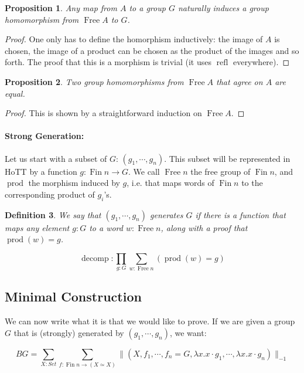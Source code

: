 \documentclass{article}
\DeclareMathOperator{\product}{prod}
\DeclareMathOperator{\decomp}{decomp}
\DeclareMathOperator{\fin}{Fin}
\DeclareMathOperator{\free}{Free}
\DeclareMathOperator{\refl}{refl}
\newtheorem{definition}{Definition}[section]
\newtheorem{proposition}[definition]{Proposition}
\begin{document}
\begin{proposition}
  Any map from $A$ to a group $G$ naturally induces a group homomorphism from $\free A$ to $G$.
\end{proposition}

\begin{proof}
  One only has to define the homorphism inductively: the image of $A$ is chosen, the image of a product can be chosen as the product of the images and so forth. The proof that this is a morphism is trivial (it uses $\refl$ everywhere).
\end{proof}

\begin{proposition} \label{uniq}
  Two group homomorphisms from $\free A$ that agree on $A$ are equal.
\end{proposition}

\begin{proof}
  This is shown by a straightforward induction on $\free A$.
\end{proof}

\paragraph{Strong Generation:} Let us start with a subset of $G$: $(g_1,\cdots, g_{n})$. This subset will be represented in HoTT by a function $g : \fin n \to G$. We call $\free n$ the free group of $\fin n$, and $\product$ the morphism induced by $g$, i.e. that maps words of $\fin n$ to the corresponding product of $g_{i}$'s.

\begin{definition}
  We say that $(g_1, \cdots, g_{n})$ \emph{generates} $G$ if there is a function that maps any element $g : G$ to a word $w : \free n$, along with a proof that $\product(w) = g$.

  \[\decomp : \prod_{g : G} \sum_{w : \free n} (\product(w) = g)\]
\end{definition}

\subsection{Minimal Construction}

We can now write what it is that we would like to prove. If we are given a group $G$ that is (strongly) generated by $(g_{1}, \cdots, g_{n})$, we want:

\[BG = \sum_{X : Set} \sum_{f : \fin n \to (X \simeq X)} \| (X, f_1, \cdots, f_{n} = G, \lambda x . x \cdot g_1, \cdots, \lambda x . x \cdot g_{n}) \|_{-1}\]
\end{document}
